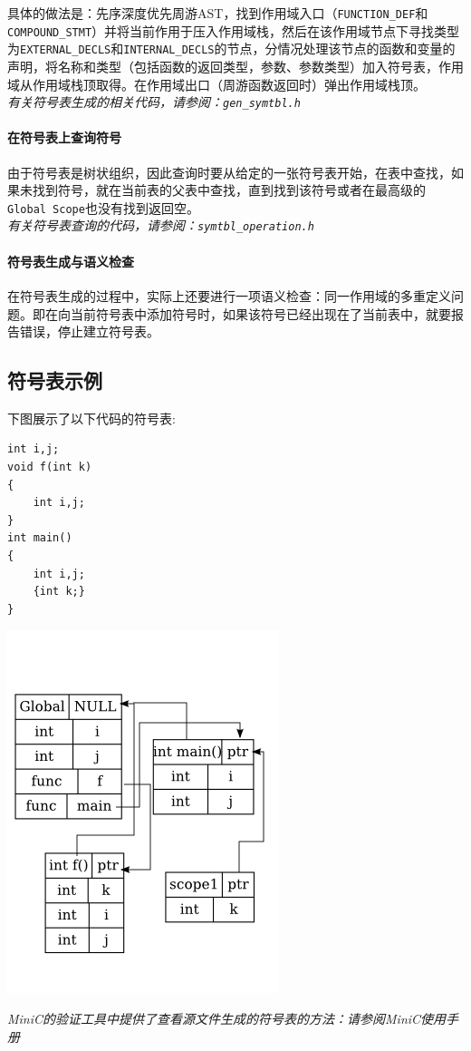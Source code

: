 具体的做法是：先序深度优先周游AST，找到作用域入口（\verb|FUNCTION_DEF|和\verb|COMPOUND_STMT|）并将当前作用于压入作用域栈，然后在该作用域节点下寻找类型为\verb|EXTERNAL_DECLS|和\verb|INTERNAL_DECLS|的节点，分情况处理该节点的函数和变量的声明，将名称和类型（包括函数的返回类型，参数、参数类型）加入符号表，作用域从作用域栈顶取得。在作用域出口（周游函数返回时）弹出作用域栈顶。\\
{\it \anchor 有关符号表生成的相关代码，请参阅：\verb|gen_symtbl.h|}\\

\paragraph*{在符号表上查询符号}
由于符号表是树状组织，因此查询时要从给定的一张符号表开始，在表中查找，如果未找到符号，就在当前表的父表中查找，直到找到该符号或者在最高级的\verb|Global Scope|也没有找到返回空。
\\
{\it \anchor 有关符号表查询的代码，请参阅：\verb|symtbl_operation.h|}\\
\paragraph*{符号表生成与语义检查}
\label{declchk}
在符号表生成的过程中，实际上还要进行一项语义检查：同一作用域的多重定义问题。即在向当前符号表中添加符号时，如果该符号已经出现在了当前表中，就要报告错误，停止建立符号表。

\subsection{符号表示例}
下图展示了以下代码的符号表:
\begin{lstlisting}
int i,j;
void f(int k)
{
	int i,j;
}
int main()
{
	int i,j;
	{int k;}
}
\end{lstlisting}
\begin{center}
	\includegraphics[scale=0.6]{symtbl.png}
\end{center}
{\it \manerrarrow MiniC的验证工具中提供了查看源文件生成的符号表的方法：请参阅MiniC使用手册}\\
